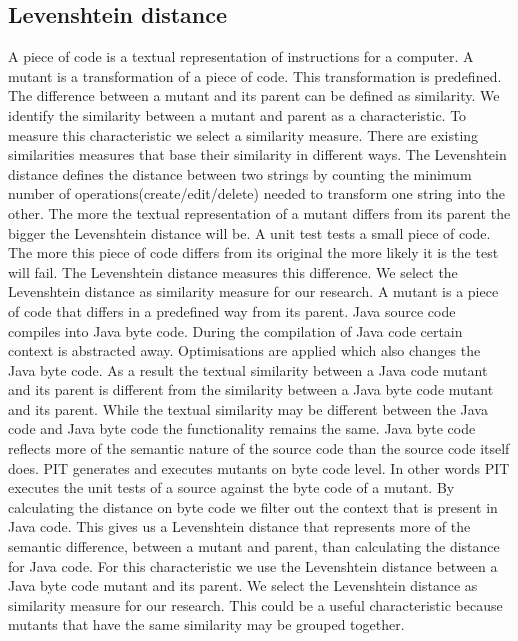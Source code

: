 \documentclass[conference,draftclsnofoot,onecolumn]{IEEEtran}
\begin{document}
\subsection{Levenshtein distance}
A piece of code is a textual representation of instructions for a computer.
A mutant is a transformation of a piece of code.
This transformation is predefined.
The difference between a mutant and its parent can be defined as similarity.
We identify the similarity between a mutant and parent as a characteristic.
\newline
To measure this characteristic we select a similarity measure.
There are existing similarities measures that base their similarity in different ways\cite{Gomma2013AApproaches}. 
\newline
The Levenshtein distance defines the distance between two strings by counting the minimum number of operations(create/edit/delete) needed to transform one string into the other\cite{Gomma2013AApproaches}.
The more the textual representation of a mutant differs from its parent the bigger the Levenshtein distance will be.
A unit test tests a small piece of code.
The more this piece of code differs from its original the more likely it is the test will fail.
The Levenshtein distance measures this difference.
We select the Levenshtein distance as similarity measure for our research\cite{Gomma2013AApproaches}.
\newline
A mutant is a piece of code that differs in a predefined way from its parent.
Java source code compiles into Java byte code.
During the compilation of Java code certain context is abstracted away\cite{byteCodeEngineering}.
Optimisations are applied which also changes the Java byte code\cite{byteCodeEngineering}.
As a result the textual similarity between a Java code mutant and its parent is different from the similarity between a Java byte code mutant and its parent.
While the textual similarity may be different between the Java code and Java byte code the functionality remains the same. 
Java byte code reflects more of the semantic nature of the source code than the source code itself does. 
PIT generates and executes mutants on byte code level\cite{pitestBytecode}. 
In other words PIT executes the unit tests of a source against the byte code of a mutant.
\newline
By calculating the distance on byte code we filter out the context that is present in Java code.
This gives us a Levenshtein distance that represents more of the semantic difference, between a mutant and parent, than calculating the distance for Java code.
For this characteristic we use the Levenshtein distance between a Java byte code mutant and its parent.
\newline
We select the Levenshtein distance as similarity measure for our research\cite{Gomma2013AApproaches}.
This could be a useful characteristic because mutants that have the same similarity may be grouped together.
\end{document}
